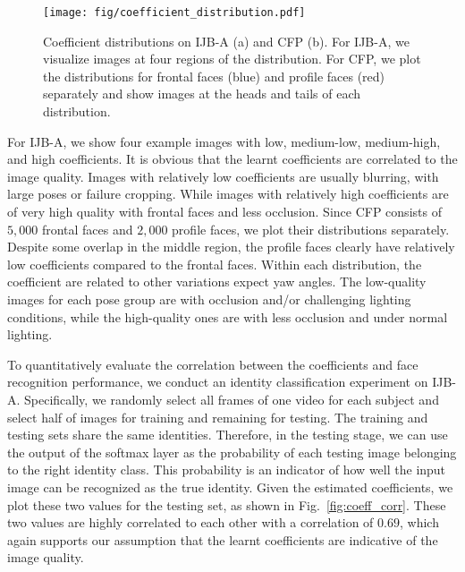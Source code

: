 \documentclass[10pt,journal,compsoc]{IEEEtran}
\begin{document}
\begin{figure*}[t!]
\begin{center}
\texttt{[image: fig/coefficient\_distribution.pdf]}
\end{center}
\vspace{-1mm}
   \caption{\small Coefficient distributions on IJB-A (a) and CFP (b). For IJB-A, we visualize images at four regions of the distribution. For CFP, we plot the distributions for frontal faces (blue) and profile faces (red) separately and show images at the heads and tails of each distribution. }
\label{fig:coeff}
\end{figure*}For IJB-A, we show four example images with low, medium-low, medium-high, and high coefficients. 
It is obvious that the learnt coefficients are correlated to the image quality. 
Images with relatively low coefficients are usually blurring, with large poses or failure cropping. 
While images with relatively high coefficients are of very high quality with frontal faces and less occlusion. 
Since CFP consists of $5,000$ frontal faces and $2,000$ profile faces, we plot their distributions separately.
Despite some overlap in the middle region, the profile faces clearly have relatively low coefficients compared to the frontal faces. 
Within each distribution, the coefficient are related to other variations expect yaw angles. 
The low-quality images for each pose group are with occlusion and/or challenging lighting conditions, while the high-quality ones are with less occlusion and under normal lighting. 

To quantitatively evaluate the correlation between the coefficients and face recognition performance, we conduct an identity classification experiment on IJB-A.  
Specifically, we randomly select all frames of one video for each subject and select half of images for training and remaining for testing.
The training and testing sets share the same identities.
Therefore, in the testing stage, we can use the output of the softmax layer as the probability of each testing image belonging to the right identity class. 
This probability is an indicator of how well the input image can be recognized as the true identity.  
Given the estimated coefficients, we plot these two values for the testing set, as shown in Fig.~\ref{fig:coeff_corr}. 
These two values are highly correlated to each other with a correlation of $0.69$, which again supports our assumption that the learnt coefficients are indicative of the image quality. 
\end{document}
